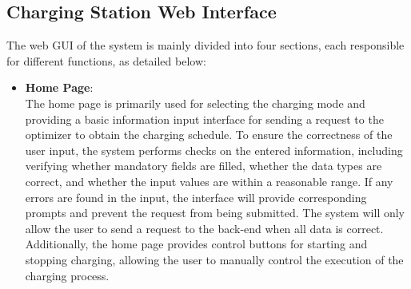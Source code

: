 \documentclass[
	english,
	ruledheaders=section,%
	class=report,%
	thesis={type=Report},%
	accentcolor=9c,%
	custommargins=true,%
	marginpar=false,%
	parskip=half-,%
	fontsize=11pt,%
	logofile={img/tuda_logo.pdf}, %
]{tudapub}
\begin{document}
\subsection{Charging Station Web Interface}
The web \ac{GUI} of the system is mainly divided into four sections, each responsible for different functions, as detailed below:
\begin{itemize}
    \item \textbf{Home Page}:\\
    The home page is primarily used for selecting the charging mode and providing a basic information input interface for sending a request to the optimizer to obtain the charging schedule. To ensure the correctness of the user input, the system performs checks on the entered information, including verifying whether mandatory fields are filled, whether the data types are correct, and whether the input values are within a reasonable range. If any errors are found in the input, the interface will provide corresponding prompts and prevent the request from being submitted. The system will only allow the user to send a request to the back-end when all data is correct. Additionally, the home page provides control buttons for starting and stopping charging, allowing the user to manually control the execution of the charging process.



\end{itemize}
\end{document}
